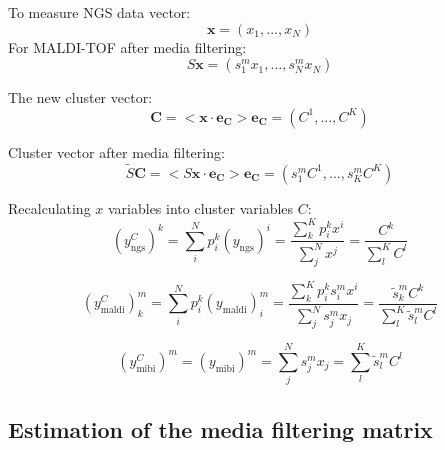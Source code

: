 \documentclass[10pt,A4paper]{article}
\begin{document}
To measure NGS data vector:
\begin{equation}
    \mathbf{x} = (x_1, ..., x_N)
\end{equation}
For MALDI-TOF after media filtering:
\begin{equation}
    S\mathbf{x} = (s^m_1 x_1, ..., s^m_N x_N)
\end{equation}

The new cluster vector:
\begin{equation}
    \mathbf{C} = <\mathbf{x} \cdot \mathbf{e_C}> \mathbf{e_C} = (C^1, ..., C^K)
\end{equation}

Cluster vector after media filtering:
\begin{equation}
   \tilde{S} \mathbf{C} = <S \mathbf{x} \cdot \mathbf{e_C}> \mathbf{e_C} = (s^m_1 C^1, ..., s^m_K C^K)
\end{equation}

Recalculating $x$ variables into cluster variables $C$:
\begin{equation}
    (y^C_\text{ngs})^k = \sum_i^N p_i^k (y_\text{ngs})^i = \frac{\sum_k^K p_i^k x^i}{\sum_j^N x^j} = \frac{C^k}{\sum_l^K C^l}
\end{equation}

\begin{equation}
    (y^C_\text{maldi})_k^m = \sum_i^N p_i^k (y_\text{maldi})_i^m = \frac{\sum_k^K p_i^k s^m_i x^i}{\sum_j^N s^m_j x_j} = \frac{\tilde s^m_k C^k}{\sum_l^K  \tilde s^m_l C^l}
\end{equation}

\begin{equation}
    (y^C_\text{mibi})^m = (y_\text{mibi})^m = \sum_j^N s^m_j x_j = \sum_l^K  \tilde s^m_l C^l
\end{equation}


\subsection{Estimation of the media filtering matrix}
\end{document}
